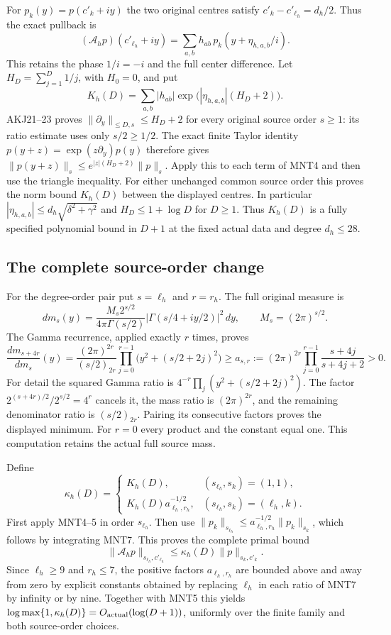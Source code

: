 \documentclass[11pt,a4paper]{article}
\begin{document}
For $p_k(y)=p(c'_k+iy)$ the two original centres satisfy
$c'_k-c'_{\ell_h}=d_h/2$. Thus the exact pullback is
\[
 (\mathcal A_hp)(c'_{\ell_h}+iy)
    =\sum_{a,b}h_{ab}\,
                   p_k(y+\eta_{h,a,b}/i).
 \tag{MNT4}
\]
This retains the phase $1/i=-i$ and the full center difference.
Let $H_D=\sum_{j=1}^D1/j$, with $H_0=0$, and put
\[
 K_h(D)=\sum_{a,b}|h_{ab}|
               \exp\bigl(|\eta_{h,a,b}|(H_D+2)\bigr).
 \tag{MNT5}
\]
AKJ21--23 proves
$\|\partial_y\|_{\le D,s}\le H_D+2$ for every original
source order $s\ge1$: its ratio estimate uses only $s/2\ge1/2$.
The exact finite Taylor identity
$p(y+z)=\exp(z\partial_y)p(y)$ therefore gives
$\|p(y+z)\|_s\le e^{|z|(H_D+2)}\|p\|_s$.
Apply this to each term of MNT4 and then use the triangle
inequality. For either unchanged common source order this
proves the norm bound $K_h(D)$ between the displayed centres.
In particular
$|\eta_{h,a,b}|\le d_h\sqrt{\delta^2+\gamma^2}$ and
$H_D\le1+\log D$ for $D\ge1$. Thus $K_h(D)$ is a
fully specified polynomial bound in $D+1$ at the fixed
actual data and degree $d_h\le28$.

\subsection{The complete source-order change}

For the degree-order pair put $s=\ell_h$ and $r=r_h$.
The full original measure is
\[
 dm_s(y)=
 \frac{M_s2^{s/2}}{4\pi\Gamma(s/2)}
       |\Gamma(s/4+iy/2)|^2\,dy,\qquad M_s=(2\pi)^{s/2}.
 \tag{MNT6}
\]
The Gamma recurrence, applied exactly $r$ times, proves
\[
 \frac{dm_{s+4r}}{dm_s}(y)
   =\frac{(2\pi)^{2r}}{(s/2)_{2r}}
         \prod_{j=0}^{r-1}\bigl(y^2+(s/2+2j)^2\bigr)
   \ge a_{s,r}:=(2\pi)^{2r}
                 \prod_{j=0}^{r-1}\frac{s+4j}{s+4j+2}>0 .
 \tag{MNT7}
\]
For detail the squared Gamma ratio is
$4^{-r}\prod_j(y^2+(s/2+2j)^2)$.
The factor $2^{(s+4r)/2}/2^{s/2}=4^r$ cancels it,
the mass ratio is $(2\pi)^{2r}$, and the remaining
denominator ratio is $(s/2)_{2r}$.
Pairing its consecutive factors proves the displayed
minimum. For $r=0$ every product and the constant equal one.
This computation retains the actual full source mass.

Define
\[
 \kappa_h(D)=
 \begin{cases}
 K_h(D),&(s_{\ell_h},s_k)=(1,1),\\
 K_h(D)a_{\ell_h,r_h}^{-1/2},
                         &(s_{\ell_h},s_k)=(\ell_h,k).
 \end{cases}
 \tag{MNT8}
\]
First apply MNT4--5 in order $s_{\ell_h}$. Then use
$\|p_k\|_{s_{\ell_h}}\le a_{\ell_h,r_h}^{-1/2}
\|p_k\|_{s_k}$, which follows by integrating MNT7.
This proves the complete primal bound
\[
 \|\mathcal A_hp\|_{s_{\ell_h},c'_{\ell_h}}
        \le\kappa_h(D)\|p\|_{s_k,c'_k}.
 \tag{MNT9}
\]
Since $\ell_h\ge9$ and $r_h\le7$, the positive factors
$a_{\ell_h,r_h}$ are bounded above and away from zero
by explicit constants obtained by replacing $\ell_h$
in each ratio of MNT7 by infinity or by nine.
Together with MNT5 this yields
$\log\max\{1,\kappa_h(D)\}=O_{\rm actual}(\log(D+1))$,
uniformly over the finite family and both source-order choices.
\end{document}
